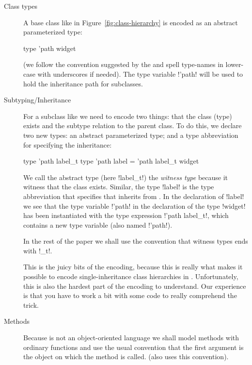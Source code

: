 \documentclass[workingdraft]{usetex-v1}
\begin{document}
\begin{description}
\item[Class types] A base class like  in
  Figure~\ref{fig:class-hierarchy} is encoded as an abstract
  parameterized type:
\begin{SMLcode}
type 'path widget
\end{SMLcode}
(we follow the convention suggested by the \smlbasis and spell
type-names in lower-case with underscores if needed).  The type
variable !'path! will be used to hold the inheritance path for
subclasses.


\item[Subtyping/Inheritance] For a subclass like  we
  need to encode two things: that the class (type) exists and the
  subtype relation to the parent class.  To do this, we declare two
  new \sml types: an abstract parameterized type; and a type
  abbreviation for specifying the inheritance:
\begin{SMLcode}
type 'path label_t
type 'path label = 
        'path label_t widget
\end{SMLcode}
We call the abstract type (here !label_t!) the \emph{witness type}
because it witness that the class exists.  Similar, the type !label!
is the type abbreviation that specifies that  inherits
from .  In the declaration of !label!  we see that
the type variable !'path! in the declaration of the type !widget!  has
been instantiated with the type expression !'path label_t!, which
contains a new type variable (also named !'path!).

In the rest of the paper we shall use the convention that witness
types ends with !_t!.

This is the juicy bits of the encoding, because this is really what
makes it possible to encode single-inheritance class hierarchies in
\sml.  Unfortunately, this is also the hardest part of the encoding to
understand.  Our experience is that you have to work a bit with some
code to really comprehend the trick.



\item[Methods] Because \sml is not an object-oriented language we shall
  model methods with ordinary functions and use the usual convention
  that the first argument is the object on which the method is called.
  (\gtk also uses this convention).
  

\end{description}
\end{document}
